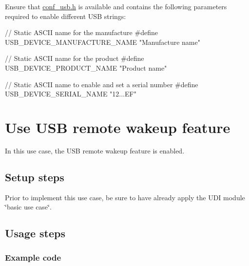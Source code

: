 \begin{DoxyEnumerate}
\item Ensure that \hyperlink{conf__usb_8h}{conf\-\_\-usb.\-h} is available and contains the following parameters required to enable different U\-S\-B strings\-:
\begin{DoxyItemize}
\item 
\begin{DoxyCode}
 \textcolor{comment}{// Static ASCII name for the manufacture}
\textcolor{preprocessor}{        #define  USB\_DEVICE\_MANUFACTURE\_NAME "Manufacture name" }
\end{DoxyCode}

\item 
\begin{DoxyCode}
 \textcolor{comment}{// Static ASCII name for the product}
\textcolor{preprocessor}{        #define  USB\_DEVICE\_PRODUCT\_NAME "Product name" }
\end{DoxyCode}

\item 
\begin{DoxyCode}
 \textcolor{comment}{// Static ASCII name to enable and set a serial number}
\textcolor{preprocessor}{        #define  USB\_DEVICE\_SERIAL\_NAME "12...EF" }
\end{DoxyCode}
 
\end{DoxyItemize}
\end{DoxyEnumerate}\hypertarget{udc_use_case_3}{}\section{Use U\-S\-B remote wakeup feature}\label{udc_use_case_3}
In this use case, the U\-S\-B remote wakeup feature is enabled.\hypertarget{udc_use_case_3_udc_use_case_3_setup}{}\subsection{Setup steps}\label{udc_use_case_3_udc_use_case_3_setup}
Prior to implement this use case, be sure to have already apply the U\-D\-I module \char`\"{}basic use case\char`\"{}.\hypertarget{udc_use_case_3_udc_use_case_3_usage}{}\subsection{Usage steps}\label{udc_use_case_3_udc_use_case_3_usage}
\hypertarget{udc_use_case_3_udc_use_case_3_usage_code}{}\subsubsection{Example code}\label{udc_use_case_3_udc_use_case_3_usage_code}

